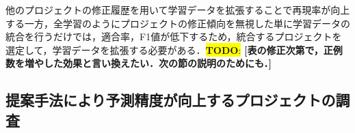 \documentclass[submit]{ipsj}
\newcommand{\todo}[1]{\colorbox{yellow}{{\bf TODO}:}{\color{red} {\textbf{[#1]}}}}
\begin{document}


\begin{screen}
他のプロジェクトの修正履歴を用いて学習データを拡張することで再現率が向上する一方，全学習のようにプロジェクトの修正傾向を無視した単に学習データの統合を行うだけでは，適合率，F1値が低下するため，統合するプロジェクトを選定して，学習データを拡張する必要がある．\todo{表の修正次第で，正例数を増やした効果と言い換えたい．次の節の説明のためにも．}
\end{screen}


\subsection{提案手法により予測精度が向上するプロジェクトの調査}
\end{document}
